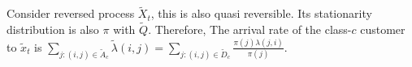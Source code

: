 \documentclass[all-lectures.tex]{subfiles}
\begin{document}
Consider reversed process $\tilde{X}_t$, this is also quasi reversible. Its stationarity distribution is also $\pi$ with $\tilde{Q}$.
Therefore,
The arrival rate of the class-$c$ customer to $\tilde{x}_t$ is $\sum_{j:(i,j) \in \tilde{A}_c}  \tilde{\lambda}(i,j) = \sum_{j:(i,j) \in \tilde{D}_c} \frac{\pi(j) \lambda(j,i)}{\pi(j)}$.
\end{document}
